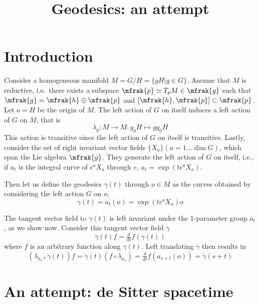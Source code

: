 \documentclass[10pt]{article}
\author{}
\title{Geodesics: an attempt}
\date{}
\numberwithin{equation}{section}
\begin{document}
\maketitle

\section{Introduction}

Consider a homogeneous manifold $M = G/H = \{gH | g \in G\}$.  
Assume that $M$ is reductive, i.e.\ there exists a subspace 
$\mfrak{p} \simeq T_p M \in \mfrak{g}$ such that $\mfrak{g} = 
\mfrak{h} \oplus \mfrak{p}$ and $[\mfrak{h},\mfrak{p}] \subset 
\mfrak{p}$. Let $o = H$ be the origin of $M$. The left action of 
$G$ on itself induces a left action of $G$ on $M$, that is
%
\begin{displaymath}
	\lambda_g : M \rightarrow M : g_0 H \mapsto g g_0 H
\end{displaymath}
This action is transitive since the left action of $G$ on itself 
is transitive. Lastly, consider the set of right invariant vector 
fields $\{X_a\} (a = 1\ldots \dim G)$, which span the Lie algebra 
$\mfrak{g}$. They generate the left action of $G$ on itself, 
i.e., if $a_t$ is the integral curve of $\epsilon^a X_a$ through 
$e$, $a_t = \exp (t \epsilon^a X_a)$.

Then let us define the geodesics $\gamma(t)$ through $o \in M$ as 
the curves obtained by considering the left action $G$ on $o$,
%
\begin{equation}
	\gamma(t) = a_t(o) = \exp(t \epsilon^a X_a) o
\end{equation}

The tangent vector field to $\gamma(t)$ is left invariant under 
the 1-parameter group $a_t$, as we show now. Consider
this tangent vector field $\dot{\gamma}$
%
\begin{displaymath}
	\dot{\gamma}(t)f = \tfrac{d}{dt} f(\gamma(t))
\end{displaymath}
where $f$ is an arbitrary function along $\gamma(t)$. Left 
translating $\dot{\gamma}$ then results in
%
\begin{displaymath}
	(\lambda_{a_s \ast} \dot{\gamma}(t))f = \dot{\gamma}(t)(f\circ 
	\lambda_{a_s}) = \tfrac{d}{dt} f(a_{s+t}(o)) = 
	\dot{\gamma}(s+t)
\end{displaymath}

\section{An attempt: de Sitter spacetime}
\end{document}
